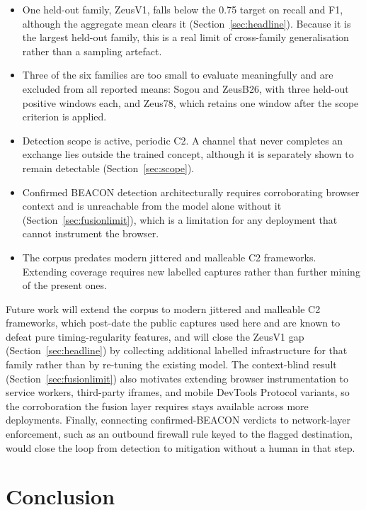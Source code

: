 \documentclass[conference,a4paper]{IEEEtran}
\begin{document}
\begin{itemize}
\item One held-out family, ZeusV1, falls below the 0.75 target on recall and F1, although the aggregate mean clears it (Section~\ref{sec:headline}). Because it is the largest held-out family, this is a real limit of cross-family generalisation rather than a sampling artefact.
\item Three of the six families are too small to evaluate meaningfully and are excluded from all reported means: Sogou and ZeusB26, with three held-out positive windows each, and Zeus78, which retains one window after the scope criterion is applied.
\item Detection scope is active, periodic C2. A channel that never completes an exchange lies outside the trained concept, although it is separately shown to remain detectable (Section~\ref{sec:scope}).
\item Confirmed BEACON detection architecturally requires corroborating browser context and is unreachable from the model alone without it (Section~\ref{sec:fusionlimit}), which is a limitation for any deployment that cannot instrument the browser.
\item The corpus predates modern jittered and malleable C2 frameworks. Extending coverage requires new labelled captures rather than further mining of the present ones.
\end{itemize}

Future work will extend the corpus to modern jittered and malleable C2 frameworks, which post-date the public captures used here and are known to defeat pure timing-regularity features, and will close the ZeusV1 gap (Section~\ref{sec:headline}) by collecting additional labelled infrastructure for that family rather than by re-tuning the existing model. The context-blind result (Section~\ref{sec:fusionlimit}) also motivates extending browser instrumentation to service workers, third-party iframes, and mobile DevTools Protocol variants, so the corroboration the fusion layer requires stays available across more deployments. Finally, connecting confirmed-BEACON verdicts to network-layer enforcement, such as an outbound firewall rule keyed to the flagged destination, would close the loop from detection to mitigation without a human in that step.

\section{Conclusion}\label{sec:conclusion}
\end{document}

